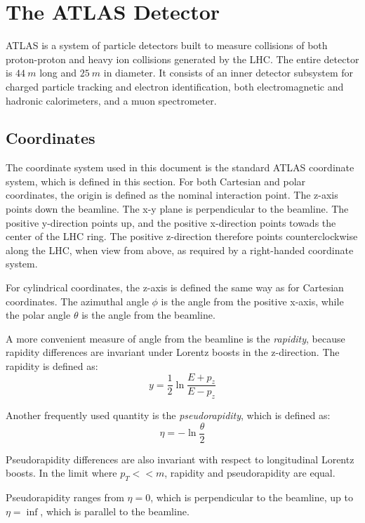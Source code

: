 \chapter{The ATLAS Detector} \label{chapter-atlas}

ATLAS is a system of particle detectors built to
measure collisions of both proton-proton and heavy ion collisions
generated by the LHC. \cite{atlas-detector-2008} The entire detector
is $44~m$ long and $25~m$ in diameter. It consists of an inner
detector subsystem for charged particle tracking and electron
identification, both electromagnetic and hadronic calorimeters, and a
muon spectrometer.

\section{Coordinates}
The coordinate system used in this document is the standard ATLAS
coordinate system, which is defined in this section. For both Cartesian and
polar coordinates, the origin is defined as the nominal interaction
point. The z-axis points down the beamline. The x-y plane is
perpendicular to the beamline. The positive y-direction points up, and
the positive x-direction points towads the center of the LHC ring. The
positive z-direction therefore points counterclockwise along the LHC,
when view from above, as required by a right-handed coordinate system.

For cylindrical coordinates, the z-axis is defined the same way as for
Cartesian coordinates. The azimuthal angle $\phi$ is the angle
from the positive x-axis, while the polar angle $\theta$ is the angle
from the beamline.

A more convenient measure of angle from the beamline is the
\textit{rapidity}, because rapidity differences are invariant under Lorentz boosts in the
z-direction. The rapidity is defined as:
\begin{equation}
y = \frac{1}{2}\ln\frac{E+p_z}{E-p_z}
\end{equation}

Another frequently used quantity is the
\textit{pseudorapidity}, which is defined as:
\begin{equation}
\eta = -\ln\frac{\theta}{2}
\end{equation}

Pseudorapidity differences are also invariant with respect to
longitudinal Lorentz boosts. In the limit where $p_T << m$, rapidity and
pseudorapidity are equal.

Pseudorapidity ranges from $\eta=0$, which is perpendicular to the
beamline, up to $\eta=\inf$, which is parallel to the beamline.

